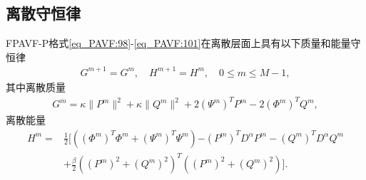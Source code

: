 \subsection{离散守恒律}
\begin{theorem}\label{thm_PAVF:4}
FPAVF-P格式\eqref{eq_PAVF:98}-\eqref{eq_PAVF:101}在离散层面上具有以下质量和能量守恒律
\begin{align}\label{eq_PAVF:11141}
G^{m+1}=G^{m} , \quad H^{m+1}=H^{m} , \quad 0 \leq m \leq M-1 , 
\end{align}
其中离散质量
\begin{align}\label{eq_PAVF:11142}
G^{m}=\kappa\|P^{m}\|^2+\kappa\|Q^{m}\|^2+2 \left(\Psi^{m}\right)^T P^{m}-2 \left(\varPhi^{m}\right)^T Q^{m} , 
\end{align}
离散能量
\begin{align}
H^{m}=&\frac{1}{2}[((\varPhi^{m})^{T}\varPhi^{m}+(\Psi^{m})^{T}\Psi^{m}){-(P^{m})^{T} D^{\alpha} P^{m}-(Q^{m})^{T} D^{\alpha} Q^{m}}\nonumber\\
&+\frac{\beta}{2}((P^{m})^2+(Q^{m})^2)^{T}((P^{m})^2+(Q^{m})^2)] . \label{eq_PAVF:800}
\end{align}
\end{theorem}

